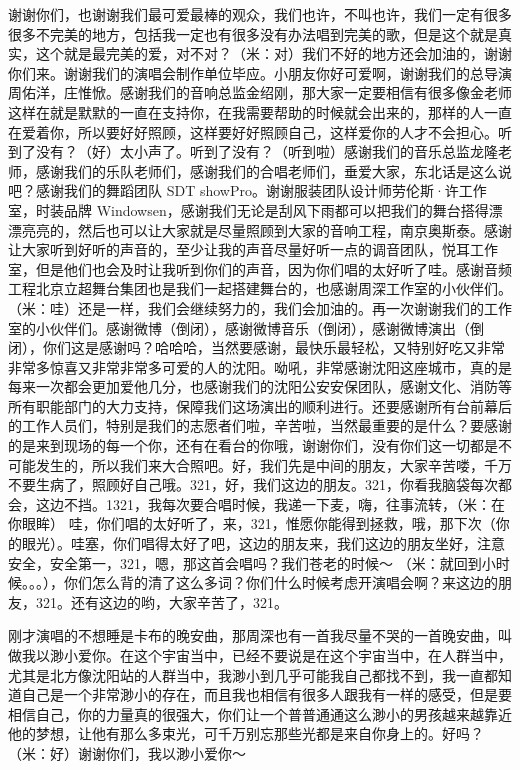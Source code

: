 \documentclass[
]{book}
\begin{document}
谢谢你们，也谢谢我们最可爱最棒的观众，我们也许，不叫也许，我们一定有很多很多不完美的地方，包括我一定也有很多没有办法唱到完美的歌，但是这个就是真实，这个就是最完美的爱，对不对？（米：对）我们不好的地方还会加油的，谢谢你们来。谢谢我们的演唱会制作单位毕应。小朋友你好可爱啊，谢谢我们的总导演周佑洋，庄惟惞。感谢我们的音响总监金绍刚，那大家一定要相信有很多像金老师这样在就是默默的一直在支持你，在我需要帮助的时候就会出来的，那样的人一直在爱着你，所以要好好照顾，这样要好好照顾自己，这样爱你的人才不会担心。听到了没有？（好）太小声了。听到了没有？（听到啦）感谢我们的音乐总监龙隆老师，感谢我们的乐队老师们，感谢我们的合唱老师们，垂爱大家，东北话是这么说吧？感谢我们的舞蹈团队 SDT showPro。谢谢服装团队设计师劳伦斯·许工作室，时装品牌 Windowsen，感谢我们无论是刮风下雨都可以把我们的舞台搭得漂漂亮亮的，然后也可以让大家就是尽量照顾到大家的音响工程，南京奥斯泰。感谢让大家听到好听的声音的，至少让我的声音尽量好听一点的调音团队，悦耳工作室，但是他们也会及时让我听到你们的声音，因为你们唱的太好听了哇。感谢音频工程北京立超舞台集团也是我们一起搭建舞台的，也感谢周深工作室的小伙伴们。（米：哇）还是一样，我们会继续努力的，我们会加油的。再一次谢谢我们的工作室的小伙伴们。感谢微博（倒闭），感谢微博音乐（倒闭），感谢微博演出（倒闭），你们这是感谢吗？哈哈哈，当然要感谢，最快乐最轻松，又特别好吃又非常非常多惊喜又非常非常多可爱的人的沈阳。呦吼，非常感谢沈阳这座城市，真的是每来一次都会更加爱他几分，也感谢我们的沈阳公安安保团队，感谢文化、消防等所有职能部门的大力支持，保障我们这场演出的顺利进行。还要感谢所有台前幕后的工作人员们，特别是我们的志愿者们啦，辛苦啦，当然最重要的是什么？要感谢的是来到现场的每一个你，还有在看台的你哦，谢谢你们，没有你们这一切都是不可能发生的，所以我们来大合照吧。好，我们先是中间的朋友，大家辛苦喽，千万不要生病了，照顾好自己哦。321，好，我们这边的朋友。321，你看我脑袋每次都会，这边不挡。1321，我每次要合唱时候，我递一下麦，嗨，往事流转，（米：在你眼眸） 哇，你们唱的太好听了，来，321，惟愿你能得到拯救，哦，那下次（你的眼光）。哇塞，你们唱得太好了吧，这边的朋友来，我们这边的朋友坐好，注意安全，安全第一，321，嗯，那这首会唱吗？我们苍老的时候～ （米：就回到小时候。。。），你们怎么背的清了这么多词？你们什么时候考虑开演唱会啊？来这边的朋友，321。还有这边的哟，大家辛苦了，321。

刚才演唱的不想睡是卡布的晚安曲，那周深也有一首我尽量不哭的一首晚安曲，叫做我以渺小爱你。在这个宇宙当中，已经不要说是在这个宇宙当中，在人群当中，尤其是北方像沈阳站的人群当中，我渺小到几乎可能我自己都找不到，我一直都知道自己是一个非常渺小的存在，而且我也相信有很多人跟我有一样的感受，但是要相信自己，你的力量真的很强大，你们让一个普普通通这么渺小的男孩越来越靠近他的梦想，让他有那么多束光，可千万别忘那些光都是来自你身上的。好吗？（米：好）谢谢你们，我以渺小爱你～
\end{document}
